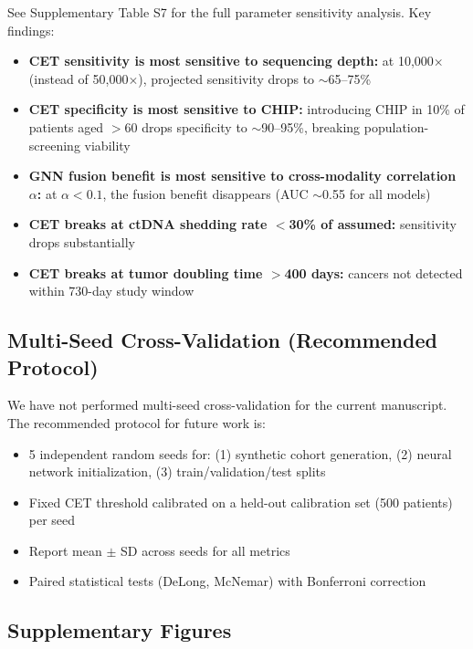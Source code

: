 \documentclass[10pt,a4paper]{article}
\begin{document}
See Supplementary Table S7 for the full parameter sensitivity analysis. Key findings:

\begin{itemize}
\item \textbf{CET sensitivity is most sensitive to sequencing depth:} at 10,000$\times$ (instead of 50,000$\times$), projected sensitivity drops to $\sim$65--75\%
\item \textbf{CET specificity is most sensitive to CHIP:} introducing CHIP in 10\% of patients aged $>$60 drops specificity to $\sim$90--95\%, breaking population-screening viability
\item \textbf{GNN fusion benefit is most sensitive to cross-modality correlation $\alpha$:} at $\alpha < 0.1$, the fusion benefit disappears (AUC $\sim$0.55 for all models)
\item \textbf{CET breaks at ctDNA shedding rate $<$30\% of assumed:} sensitivity drops substantially
\item \textbf{CET breaks at tumor doubling time $>$400 days:} cancers not detected within 730-day study window
\end{itemize}

\subsection{Multi-Seed Cross-Validation (Recommended Protocol)}

We have not performed multi-seed cross-validation for the current manuscript. The recommended protocol for future work is:

\begin{itemize}
\item 5 independent random seeds for: (1) synthetic cohort generation, (2) neural network initialization, (3) train/validation/test splits
\item Fixed CET threshold calibrated on a held-out calibration set (500 patients) per seed
\item Report mean $\pm$ SD across seeds for all metrics
\item Paired statistical tests (DeLong, McNemar) with Bonferroni correction
\end{itemize}

\subsection{Supplementary Figures}
\end{document}
